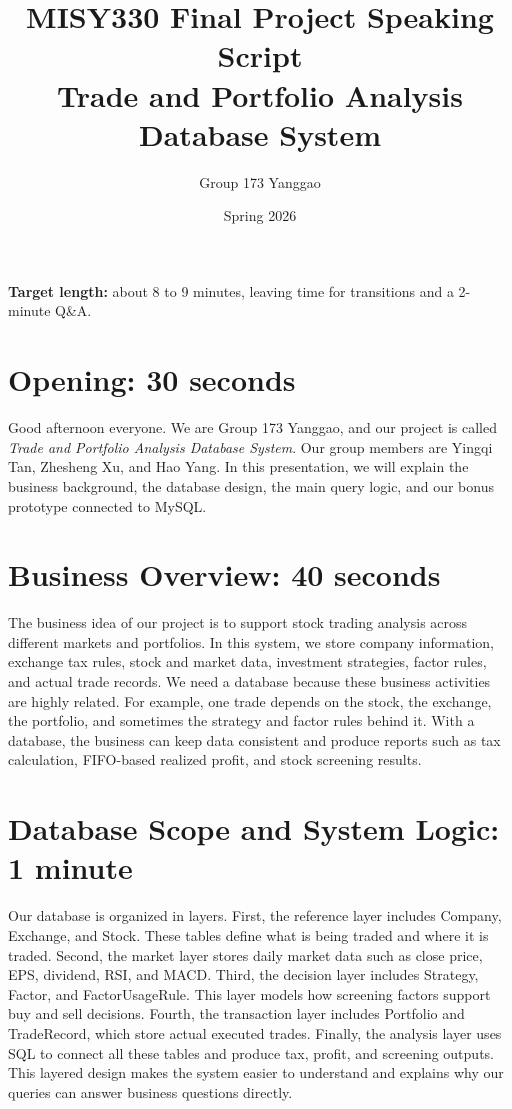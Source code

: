 \documentclass[11pt]{article}
\title{MISY330 Final Project Speaking Script\\Trade and Portfolio Analysis Database System}
\author{Group 173 Yanggao}
\date{Spring 2026}
\begin{document}
\maketitle

\textbf{Target length:} about 8 to 9 minutes, leaving time for transitions and a 2-minute Q\&A.

\section*{Opening: 30 seconds}
Good afternoon everyone. We are Group 173 Yanggao, and our project is called \textit{Trade and Portfolio Analysis Database System}. Our group members are Yingqi Tan, Zhesheng Xu, and Hao Yang. In this presentation, we will explain the business background, the database design, the main query logic, and our bonus prototype connected to MySQL.

\section*{Business Overview: 40 seconds}
The business idea of our project is to support stock trading analysis across different markets and portfolios. In this system, we store company information, exchange tax rules, stock and market data, investment strategies, factor rules, and actual trade records. We need a database because these business activities are highly related. For example, one trade depends on the stock, the exchange, the portfolio, and sometimes the strategy and factor rules behind it. With a database, the business can keep data consistent and produce reports such as tax calculation, FIFO-based realized profit, and stock screening results.

\section*{Database Scope and System Logic: 1 minute}
Our database is organized in layers. First, the reference layer includes Company, Exchange, and Stock. These tables define what is being traded and where it is traded. Second, the market layer stores daily market data such as close price, EPS, dividend, RSI, and MACD. Third, the decision layer includes Strategy, Factor, and FactorUsageRule. This layer models how screening factors support buy and sell decisions. Fourth, the transaction layer includes Portfolio and TradeRecord, which store actual executed trades. Finally, the analysis layer uses SQL to connect all these tables and produce tax, profit, and screening outputs. This layered design makes the system easier to understand and explains why our queries can answer business questions directly.
\end{document}

